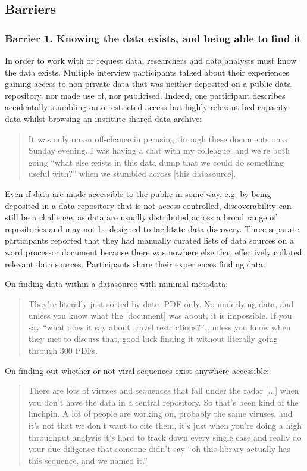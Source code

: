 \documentclass{CUP-JNL-DAP}%
\begin{document}
\subsection{Barriers}

\subsubsection{Barrier 1. Knowing the data exists, and being able to find it}
In order to work with or request data, researchers and data analysts must know the data exists. Multiple interview participants talked about their experiences gaining access to non-private data that was neither deposited on a public data repository, nor made use of, nor publicised. Indeed, one participant describes accidentally stumbling onto restricted-access but highly relevant bed capacity data whilst browsing an institute shared data archive: 

\blockquote{It was only on an off-chance in perusing through these documents on a Sunday evening. I was having a chat with my colleague,  and we're both going \enquote{what else exists in this data dump that we could do something useful with?} when we stumbled across [this datasource].}

Even if data are made accessible to the public in some way, e.g. by being deposited in a data repository that is not access controlled, discoverability can still be a challenge, as data are usually distributed across a broad range of repositories and may not be designed to facilitate data discovery. Three separate participants reported that they had manually curated lists of data sources on a word processor document because there was nowhere else that effectively collated relevant data sources. Participants share their experiences finding data: 

On finding data within a datasource with minimal metadata:

\blockquote{They're literally just sorted by date. PDF only. No underlying data, and unless you know what the [document] was about, it is impossible. If you say \enquote{what does it say about travel restrictions?}, unless you know when they met to discuss that, good luck finding it without literally going through 300 PDFs.}

On finding out whether or not viral sequences exist anywhere accessible:

\blockquote{There are lots of viruses and sequences that fall under the radar [...] when you don't have the data in a central repository. So that's been kind of the linchpin. A lot of people are working on, probably the same viruses, and it's not that we don't want to cite them, it's just when you're doing a high throughput analysis it's hard to track down every single case and really do your due diligence that someone didn't say \enquote{oh this library actually has this sequence, and we named it.}}
\end{document}
